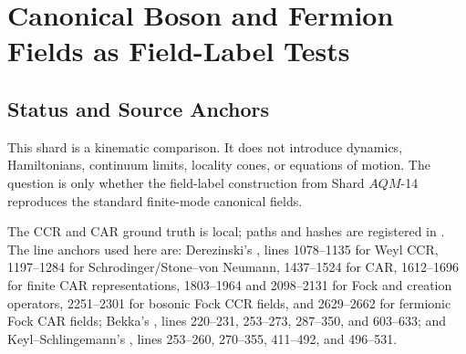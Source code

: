 
\section{Canonical Boson and Fermion Fields as Field-Label Tests}
\label{sec:canonical-boson-fermion-field-comparison}

\subsection{Status and Source Anchors}
This shard is a kinematic comparison.  It does not introduce dynamics,
Hamiltonians, continuum limits, locality cones, or equations of motion.  The
question is only whether the field-label construction from
Shard \(AQM\)-14 reproduces the standard finite-mode canonical fields.

The CCR and CAR ground truth is local; paths and hashes are registered in
.  The line anchors used here are:
Derezinski's , lines 1078--1135 for Weyl CCR, 1197--1284
for Schrodinger/Stone--von Neumann, 1437--1524 for CAR, 1612--1696 for finite
CAR representations, 1803--1964 and 2098--2131 for Fock and creation operators,
2251--2301 for bosonic Fock CCR fields, and 2629--2662 for fermionic Fock CAR
fields; Bekka's , lines 220--231, 253--273,
287--350, and 603--633; and Keyl--Schlingemann's ,
lines 253--260, 270--355, 411--492, and 496--531.

